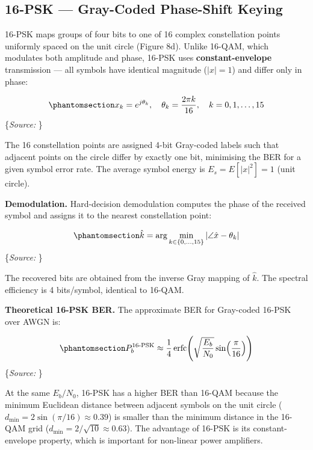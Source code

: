 \documentclass[
  english,
  12pt,
  12pt,
  a4paper,
  oneside]{report}
\begin{document}
\subsection{16-PSK --- Gray-Coded Phase-Shift Keying}\label{sec:psk-gray-coded-phase-shift-keying}

16-PSK maps groups of four bits to one of 16 complex constellation points uniformly spaced on the unit circle (Figure 8d). Unlike 16-QAM, which modulates both amplitude and phase, 16-PSK uses \textbf{constant-envelope} transmission --- all symbols have identical magnitude (\(|x| = 1\)) and differ only in phase:

\begin{equation}\protect\phantomsection\label{eq:psk16-mapping}{x_k = e^{j \theta_k}, \quad \theta_k = \frac{2\pi k}{16}, \quad k = 0, 1, \ldots, 15
}\end{equation} \footnotesize\{\textit{Source: \1}\}\normalsize

The 16 constellation points are assigned 4-bit Gray-coded labels such that adjacent points on the circle differ by exactly one bit, minimising the BER for a given symbol error rate. The average symbol energy is \(E_s = E[|x|^2] = 1\) (unit circle).

\textbf{Demodulation.} Hard-decision demodulation computes the phase of the received symbol and assigns it to the nearest constellation point:

\begin{equation}\protect\phantomsection\label{eq:psk16-decision}{\hat{k} = \arg\min_{k \in \{0,\ldots,15\}} \left| \angle \hat{x} - \theta_k \right|
}\end{equation} \footnotesize\{\textit{Source: \1}\}\normalsize

The recovered bits are obtained from the inverse Gray mapping of \(\hat{k}\). The spectral efficiency is 4 bits/symbol, identical to 16-QAM.

\textbf{Theoretical 16-PSK BER.} The approximate BER for Gray-coded 16-PSK over AWGN is:

\begin{equation}\protect\phantomsection\label{eq:psk16-ber}{P_b^{\text{16-PSK}} \approx \frac{1}{4} \operatorname{erfc}\!\left(\sqrt{\frac{E_b}{N_0}} \sin\!\left(\frac{\pi}{16}\right)\right)
}\end{equation} \footnotesize\{\textit{Source: \1}\}\normalsize

At the same \(E_b/N_0\), 16-PSK has a higher BER than 16-QAM because the minimum Euclidean distance between adjacent symbols on the unit circle (\(d_{\min} = 2\sin(\pi/16) \approx 0.39\)) is smaller than the minimum distance in the 16-QAM grid (\(d_{\min} = 2/\sqrt{10} \approx 0.63\)). The advantage of 16-PSK is its constant-envelope property, which is important for non-linear power amplifiers.
\end{document}
